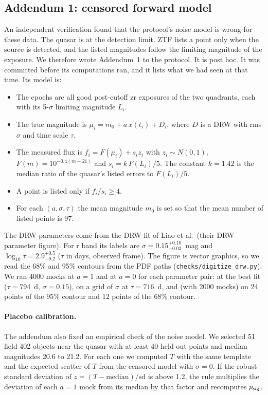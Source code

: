 \documentclass[11pt]{article}
\newcommand{\psig}{p_{\rm sig}}
\begin{document}
\subsection{Addendum 1: censored forward model}\label{sec:censored}
An independent verification found that the protocol's noise model is wrong for these data. The quasar is at the detection limit. ZTF lists a point only when the source is detected, and the listed magnitudes follow the limiting magnitude of the exposure. We therefore wrote Addendum~1 to the protocol. It is post hoc. It was committed before its computations ran, and it lists what we had seen at that time. Its model is:
\begin{itemize}
\item The epochs are all good post-cutoff zr exposures of the two quadrants, each with its 5-$\sigma$ limiting magnitude $L_i$.
\item The true magnitude is $\mu_i = m_0 + a\,x(t_i) + D_i$, where $D$ is a DRW with rms $\sigma$ and time scale $\tau$.
\item The measured flux is $f_i = F(\mu_i) + s_i z_i$ with $z_i \sim N(0,1)$, $F(m) = 10^{-0.4(m-21)}$ and $s_i = k\,F(L_i)/5$. The constant $k = 1.42$ is the median ratio of the quasar's listed errors to $F(L_i)/5$.
\item A point is listed only if $f_i/s_i \ge 4$.
\item For each $(a, \sigma, \tau)$ the mean magnitude $m_0$ is set so that the mean number of listed points is 97.
\end{itemize}
The DRW parameters come from the DRW fit of Liao et al.\ (their DRW-parameter figure). For r band its labels are $\sigma = 0.15^{+0.10}_{-0.03}$~mag and $\log_{10}\tau = 2.9^{+0.5}_{-0.2}$ ($\tau$ in days, observed frame). The figure is vector graphics, so we read the 68\% and 95\% contours from the PDF paths (\texttt{checks/digitize\_drw.py}). We ran 4000 mocks at $a = 1$ and at $a = 0$ for each parameter pair: at the best fit ($\tau = 794$~d, $\sigma = 0.15$), on a grid of $\sigma$ at $\tau = 716$~d, and (with 2000 mocks) on 24 points of the 95\% contour and 12 points of the 68\% contour.

\paragraph{Placebo calibration.} The addendum also fixed an empirical check of the noise model. We selected 51 field-402 objects near the quasar with at least 40 held-out points and median magnitudes 20.6 to 21.2. For each one we computed $T$ with the same template and the expected scatter of $T$ from the censored model with $\sigma = 0$. If the robust standard deviation of $z = (T - \text{median})/\text{sd}$ is above 1.2, the rule multiplies the deviation of each $a = 1$ mock from its median by that factor and recomputes $\psig$.
\end{document}

